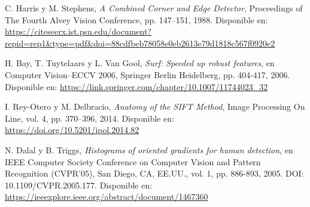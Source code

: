 \documentclass[a4paper]{article}
\begin{document}
\begin{thebibliography}{10}

  C. Harris y M. Stephens, \emph{A Combined Corner and Edge Detector}, Proceedings of The Fourth Alvey Vision Conference, pp. 147–151, 1988. Disponible en: \url{https://citeseerx.ist.psu.edu/document?repid=rep1&type=pdf&doi=88cdfbeb78058e0eb2613e79d1818c567f0920e2}
  
  H. Bay, T. Tuytelaars y L. Van Gool, \emph{Surf: Speeded up robust features}, en Computer Vision–ECCV 2006, Springer Berlin Heidelberg, pp. 404-417, 2006. Disponible en: \url{https://link.springer.com/chapter/10.1007/11744023_32}
  
  I. Rey-Otero y M. Delbracio, \emph{Anatomy of the SIFT Method}, Image Processing On Line, vol. 4, pp. 370–396, 2014. Disponible en: \url{https://doi.org/10.5201/ipol.2014.82}
  
  N. Dalal y B. Triggs, \emph{Histograms of oriented gradients for human detection}, en IEEE Computer Society Conference on Computer Vision and Pattern Recognition (CVPR'05), San Diego, CA, EE.UU., vol. 1, pp. 886-893, 2005. DOI: 10.1109/CVPR.2005.177. Disponible en: \url{https://ieeexplore.ieee.org/abstract/document/1467360}
  
  \end{thebibliography}
\end{document}

